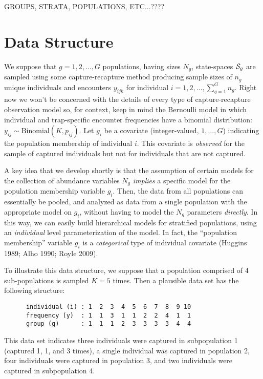 GROUPS, STRATA, POPULATIONS, ETC...????



\section{Data Structure}


We suppose that $g=1,2,\ldots,G$ populations, having sizes $N_{g}$,
state-spaces ${\cal S}_{g}$
are sampled using some
capture-recapture method producing sample sizes of $n_{g}$ unique
individuals and encounters
$y_{ijk}$ for individual $i=1,2,\ldots, \sum_{g=1}^{G} n_{g}$.  Right
now we won't be concerned with the details of every type of
capture-recapture observation model so, for context, keep in mind the
Bernoulli model in which individual and trap-specific encounter
frequencies have a binomial distribution: $y_{ij} \sim
\mbox{Binomial}(K,p_{ij})$.  Let $g_{i}$ be a covariate
(integer-valued, $1, \ldots, G$) indicating the population membership
of individual $i$. This covariate is {\it observed} for the sample of
captured individuals but not for individuals that are not captured.


A key idea that we develop shortly is that 
the assumption of certain models for the collection of abundance variables
$N_{g}$ {\it implies} a specific model for the population membership
variable $g_{i}$.  
Then, the data from all populations can essentially
be pooled, and analyzed as data from a single population with the
appropriate model on $g_{i}$, without having to model the $N_{g}$
parameters {\it directly}. In this way, we can easily build
hierarchical models for stratified populations, using an {\it
  individual} level parameterization of the model. In fact, the ``population
membership'' variable $g_{i}$ is a {\it categorical} type of individual
covariate (Huggins 1989; Alho 1990; Royle 2009).  

To illustrate this data structure, we suppose that a population
comprised of 4 sub-populations is sampled $K=5$ times. Then a
plausible data set has the following structure:
\begin{verbatim}
      individual (i) : 1  2  3  4  5  6  7  8  9 10  
      frequency (y)  : 1  1  3  1  1  2  2  4  1  1
      group (g)      : 1  1  1  2  3  3  3  3  4  4
\end{verbatim}
This data set indicates three individuals were captured in subpopulation 1
(captured 1, 1, and 3 times), a single individual was captured in
population 2, four individuals were captured in population 3, and two
individuals were captured in subpopulation 4.



